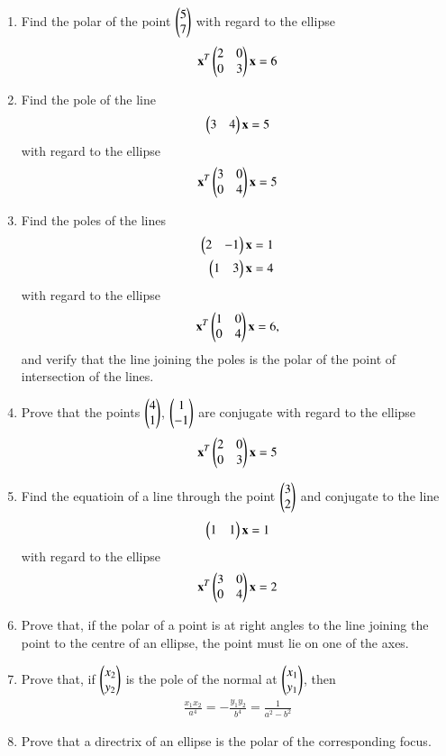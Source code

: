 \renewcommand{\theequation}{\theenumi}
\begin{enumerate}[label=\arabic*.,ref=\thesubsection.\theenumi]
\item Find the polar of the point $\begin{pmatrix}5\\7\end{pmatrix}$ with regard to the ellipse
\begin{align}
\mathbf{x}^T\begin{pmatrix}2 & 0\\0 & 3\end{pmatrix}\mathbf{x} =6
\end{align}
\item Find the pole of the line 
\begin{align}
\begin{pmatrix}3 & 4\end{pmatrix}\mathbf{x}=5
\end{align}
with regard to the ellipse
\begin{align}
\mathbf{x}^T\begin{pmatrix}3 & 0\\0 & 4\end{pmatrix}\mathbf{x} =5
\end{align}
\item Find the poles of the lines 
\begin{align}
\begin{pmatrix}2 & -1\end{pmatrix}\mathbf{x}=1
\\
\begin{pmatrix}1 & 3\end{pmatrix}\mathbf{x}=4
\end{align}
with regard to the ellipse 
\begin{align}
\mathbf{x}^T\begin{pmatrix}1 & 0\\0 & 4\end{pmatrix}\mathbf{x} =6,
\end{align}
 and verify that the line joining
the poles is the polar of the point of intersection of the lines.
\item Prove that the points $\begin{pmatrix}4\\1\end{pmatrix}$, $\begin{pmatrix}1\\-1\end{pmatrix}$ are conjugate with regard to the ellipse
\begin{align}
\mathbf{x}^T\begin{pmatrix}2 & 0\\0 & 3\end{pmatrix}\mathbf{x} =5
\end{align}
\item Find the equatioin of a line through the point $\begin{pmatrix}3\\2\end{pmatrix}$ and conjugate to the
line 
\begin{align}
\begin{pmatrix}1 & 1\end{pmatrix}\mathbf{x}=1
\end{align}
with regard to the ellipse
\begin{align}
\mathbf{x}^T\begin{pmatrix}3 & 0\\0 & 4\end{pmatrix}\mathbf{x} =2
\end{align}
\item Prove that, if the polar of a point is at right angles to the line joining the point  to
the centre of an ellipse, the point must lie on one of the axes.
\item Prove that, if $\begin{pmatrix}x_2\\y_2\end{pmatrix}$ is the pole of the normal at $\begin{pmatrix}x_1\\y_1\end{pmatrix}$, then
\begin{align}
\frac{x_1x_2}{a^4}=-\frac{y_1y_2}{b^4}  = \frac{1}{a^2-b^2}
\end{align}
\item Prove that a directrix of an ellipse is the polar of the corresponding focus.
\end{enumerate}
